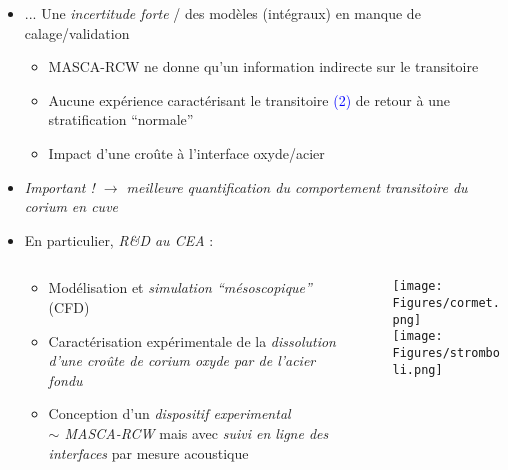 \begin{frame}[fragile]
\begin{itemize}
\item ... Une \emph{incertitude forte} / des modèles (intégraux) en manque de calage/validation
\begin{itemize}
\item MASCA-RCW ne donne qu'un information indirecte sur le transitoire
\item Aucune expérience caractérisant le transitoire \textcolor{blue}{(2)} de retour à une stratification ``normale'' 
\item Impact d'une croûte à l'interface oxyde/acier
\end{itemize}
\item \emph{Important ! $\rightarrow$ meilleure quantification du comportement transitoire du corium en cuve}
\item En particulier, \emph{R\&D au CEA} :
\begin{columns}
 \begin{column}{0.55\textwidth}
\begin{itemize}
\item Modélisation et \emph{simulation ``mésoscopique''} (CFD) \cite{Zanella2020}
\item Caractérisation expérimentale de la \emph{dissolution d'une croûte de corium oxyde par de l'acier fondu} \cite{Pivano2019}
\item Conception d'un \emph{dispositif experimental \\ $\sim$ MASCA-RCW} mais avec \emph{suivi en ligne des interfaces} par mesure acoustique \cite{Cavaro2019}
\end{itemize}
 \end{column}
 \begin{column}{0.1\textwidth}
 \begin{minipage}{\textwidth}
\end{minipage}
 \end{column}
 \begin{column}{0.35\textwidth}
 \texttt{[image: Figures/cormet.png]} \\
 \texttt{[image: Figures/stromboli.png]}
 \end{column}
\end{columns}
\end{itemize}
\end{frame}
